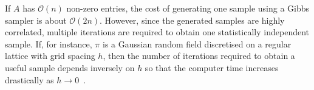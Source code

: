 \documentclass[
fontsize=11pt,
paper=a4,
numbers=noenddot
]{scrartcl}
\begin{document}

If $A$ has $\mathcal{O}(n)$ non-zero entries, the cost of generating one sample using a Gibbs sampler is about $\mathcal{O}(2n)$. However, since the generated samples are highly correlated, multiple iterations are required to obtain one statistically independent sample. If, for instance, $\pi$ is a Gaussian random field discretised on a regular lattice with grid spacing $h$, then the number of iterations required to obtain a useful sample depends inversely on $h$ so that the computer time increases drastically as $h \rightarrow 0$~\cite{goodmansokal,kazashimuellerscheichl}.
\end{document}

